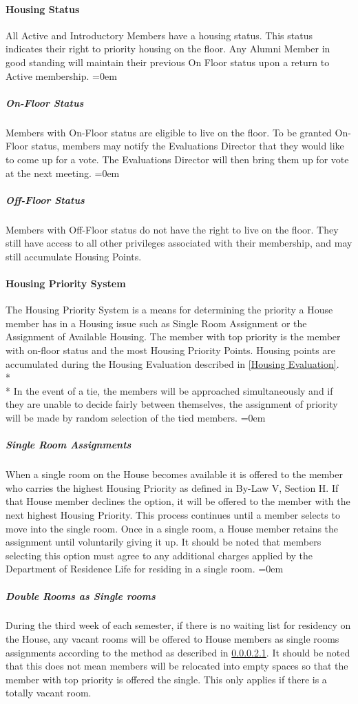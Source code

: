 \documentclass{article}
\newcommand{\asubsubsection}[1]{\paragraph{#1} \label{#1}}
\newcommand{\asubsubsubsection}[1]{\parindent=0em\subparagraph{#1} \label{#1}}
\begin{document}
\asubsubsection{Housing Status}
All Active and Introductory Members have a housing status.
This status indicates their right to priority housing on the floor.
Any Alumni Member in good standing will maintain their previous On Floor status upon a return to Active membership.
\asubsubsubsection{On-Floor Status}
Members with On-Floor status are eligible to live on the floor.
To be granted On-Floor status, members may notify the Evaluations Director that they would like to come up for a vote.
The Evaluations Director will then bring them up for vote at the next meeting.
\asubsubsubsection{Off-Floor Status}
Members with Off-Floor status do not have the right to live on the floor.
They still have access to all other privileges associated with their membership, and may still accumulate Housing Points.

\asubsubsection{Housing Priority System}
The Housing Priority System is a means for determining the priority a House member has in a Housing issue such as Single Room Assignment or the Assignment of Available Housing.
The member with top priority is the member with on-floor status and the most Housing Priority Points.
Housing points are accumulated during the Housing Evaluation described in \ref{Housing Evaluation}.
\\* \\*
In the event of a tie, the members will be approached simultaneously and if they are unable to decide fairly between themselves, the assignment of priority will be made by random selection of the tied members.
\asubsubsubsection{Single Room Assignments}
When a single room on the House becomes available it is offered to the member who carries the highest Housing Priority as defined in By-Law V, Section H.
If that House member declines the option, it will be offered to the member with the next highest Housing Priority.
This process continues until a member selects to move into the single room.
Once in a single room, a House member retains the assignment until voluntarily giving it up.
It should be noted that members selecting this option must agree to any additional charges applied by the Department of Residence Life for residing in a single room.
\asubsubsubsection{Double Rooms as Single rooms}
During the third week of each semester, if there is no waiting list for residency on the House, any vacant rooms will be offered to House members as single rooms assignments according to the method as described in \ref{Single Room Assignments}.
It should be noted that this does not mean members will be relocated into empty spaces so that the member with top priority is offered the single.
This only applies if there is a totally vacant room.
\end{document}
